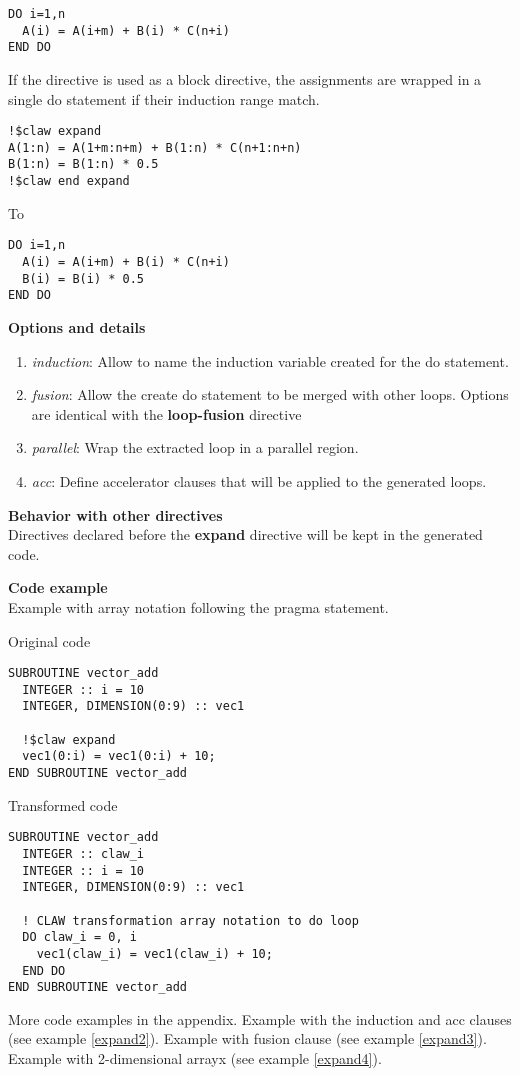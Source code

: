 \begin{lstlisting}
DO i=1,n
  A(i) = A(i+m) + B(i) * C(n+i)
END DO
\end{lstlisting}

If the directive is used as a block directive, the assignments are wrapped in
a single do statement if their induction range match.

\begin{lstlisting}
!$claw expand
A(1:n) = A(1+m:n+m) + B(1:n) * C(n+1:n+n)
B(1:n) = B(1:n) * 0.5
!$claw end expand
\end{lstlisting}

To

\begin{lstlisting}
DO i=1,n
  A(i) = A(i+m) + B(i) * C(n+i)
  B(i) = B(i) * 0.5
END DO
\end{lstlisting}


\textbf{Options and details}
\begin{enumerate}
\item \textit{induction}: Allow to name the induction variable created for the
do statement.
\item \textit{fusion}: Allow the create do statement to be merged with other
loops. Options
are identical with the \textbf{loop-fusion} directive
\item \textit{parallel}: Wrap the extracted loop in a parallel region.
\item \textit{acc}: Define accelerator clauses that will be applied to the
generated loops.
\end{enumerate}

\textbf{Behavior with other directives}\\
Directives declared before the \textbf{expand} directive will be kept
in the generated code.

\textbf{Code example}\\
\label{expand1}
Example with array notation following the pragma statement.

Original code
\begin{lstlisting}
SUBROUTINE vector_add
  INTEGER :: i = 10
  INTEGER, DIMENSION(0:9) :: vec1

  !$claw expand
  vec1(0:i) = vec1(0:i) + 10;
END SUBROUTINE vector_add
\end{lstlisting}

Transformed code
\begin{lstlisting}
SUBROUTINE vector_add
  INTEGER :: claw_i
  INTEGER :: i = 10
  INTEGER, DIMENSION(0:9) :: vec1

  ! CLAW transformation array notation to do loop
  DO claw_i = 0, i
    vec1(claw_i) = vec1(claw_i) + 10;
  END DO
END SUBROUTINE vector_add
\end{lstlisting}

More code examples in the appendix. Example with the induction and acc clauses
(see example \ref{expand2}). Example with fusion clause (see example
\ref{expand3}). Example with 2-dimensional arrayx (see example
\ref{expand4}).
